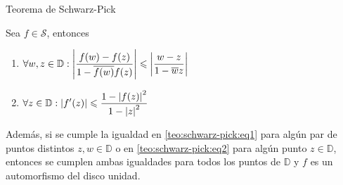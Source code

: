 \documentclass[
    aspectratio=169,
]{beamer}
\begin{document}
\begin{frame}{Teorema de Schwarz-Pick}
    
    \begin{teo}\label{teo:schwarz-pick}
        Sea $f \in \mathscr{S}$, entonces
        \begin{enumerate}[label=\textnormal{(\arabic*)}]
            \item\label{teo:schwarz-pick:eq1} $\displaystyle \forall w, z \in \mathbb{D} : \left|\frac{f(w) - f(z)}{1 - \overline{f(w)} f(z)}\right| \leqslant \left|\frac{w - z}{1 - \overline{w} z}\right|$
            \item\label{teo:schwarz-pick:eq2} $\displaystyle \forall z \in \mathbb{D} : \left|f'(z)\right| \leqslant \frac{1 - \left|f(z)\right|^2}{1 - \left|z\right|^2}$
        \end{enumerate}


        Además, si se cumple la igualdad en \ref{teo:schwarz-pick:eq1} para algún par de puntos distintos $z, w \in \mathbb{D}$ o en \ref{teo:schwarz-pick:eq2} para algún punto $z \in \mathbb{D}$, entonces se cumplen ambas igualdades para todos los puntos de $\mathbb{D}$ y $f$ es un automorfismo del disco unidad.
    \end{teo}



\end{frame}
\end{document}

